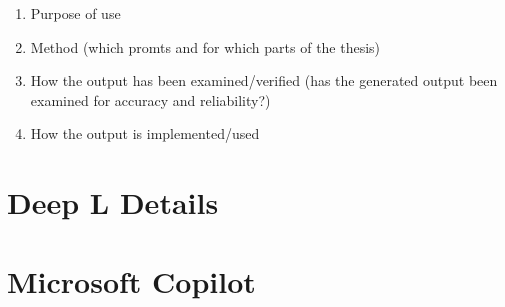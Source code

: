 \documentclass[12pt,a4paper]{book}
\theoremstyle{definition}
\theoremstyle{remark}
\begin{document}
\begin{enumerate}
    \item Purpose of use
    \item Method (which promts and for which parts of the thesis)
    \item How the output has been examined/verified (has the generated output been examined for accuracy and reliability?)
    \item How the output is implemented/used
\end{enumerate}

\section{Deep L Details}
\label{sectionDeepL}
\section{Microsoft Copilot}
\label{sectionCopilot}
\end{document}
